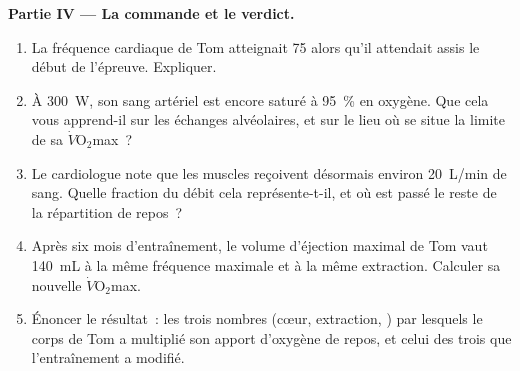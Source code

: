 \begin{problem}
\medskip
\noindent\textbf{Partie IV --- La commande et le verdict.}
\begin{enumerate}[resume]
  \item La fréquence cardiaque de Tom atteignait 75 alors qu'il
        attendait assis le début de l'épreuve. Expliquer.
  \item À \qty{300}{W}, son sang artériel est encore saturé à 95~\% en
        oxygène. Que cela vous apprend-il sur les échanges alvéolaires,
        et sur le lieu où se situe la limite de sa
        $\dot V\!\mathrm{O_2}$max~?
  \item Le cardiologue note que les muscles reçoivent désormais environ
        \qty{20}{L/min} de sang. Quelle fraction du débit cela
        représente-t-il, et où est passé le reste de la répartition de
        repos~?
  \item Après six mois d'entraînement, le volume d'éjection maximal de
        Tom vaut \qty{140}{mL} à la même fréquence maximale et à la
        même extraction. Calculer sa nouvelle
        $\dot V\!\mathrm{O_2}$max.
  \item Énoncer le résultat~: les trois nombres (cœur, extraction,
        ) par lesquels le corps de Tom a multiplié son
        apport d'oxygène de repos, et celui des trois que
        l'entraînement a modifié.
\end{enumerate}
\end{problem}
